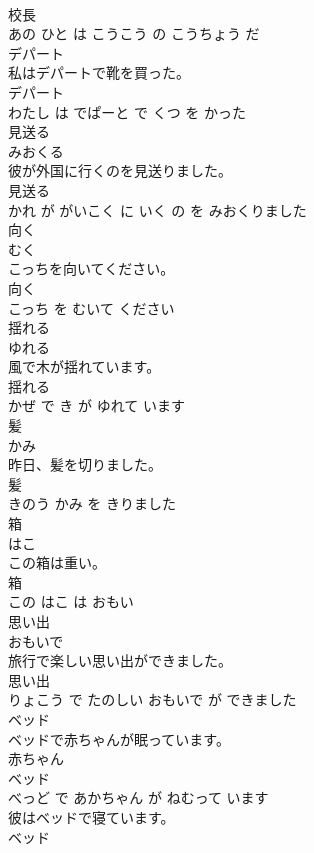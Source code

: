 \documentclass[8pt]{extreport}
\begin{document}
\begin{CJK}{UTF8}{min}
\\	校長 
\\	あの ひと は こうこう の こうちょう だ			
\\	デパート	
\\	私はデパートで靴を買った。	
\\	デパート 
\\	わたし は でぱーと で くつ を かった			
\\	見送る	
\\	みおくる			
\\	彼が外国に行くのを見送りました。	
\\	見送る 
\\	かれ が がいこく に いく の を みおくりました			
\\	向く	
\\	むく			
\\	こっちを向いてください。	
\\	向く 
\\	こっち を むいて ください			
\\	揺れる	
\\	ゆれる			
\\	風で木が揺れています。	
\\	揺れる 
\\	かぜ で き が ゆれて います			
\\	髪	
\\	かみ			
\\	昨日、髪を切りました。	
\\	髪 
\\	きのう かみ を きりました			
\\	箱	
\\	はこ			
\\	この箱は重い。	
\\	箱 
\\	この はこ は おもい			
\\	思い出	
\\	おもいで			
\\	旅行で楽しい思い出ができました。	
\\	思い出 
\\	りょこう で たのしい おもいで が できました			
\\	ベッド	
\\	ベッドで赤ちゃんが眠っています。	
\\	赤ちゃん 
\\	ベッド 
\\	べっど で あかちゃん が ねむって います			
\\	彼はベッドで寝ています。	
\\	ベッド 

\end{CJK}
\end{document}
